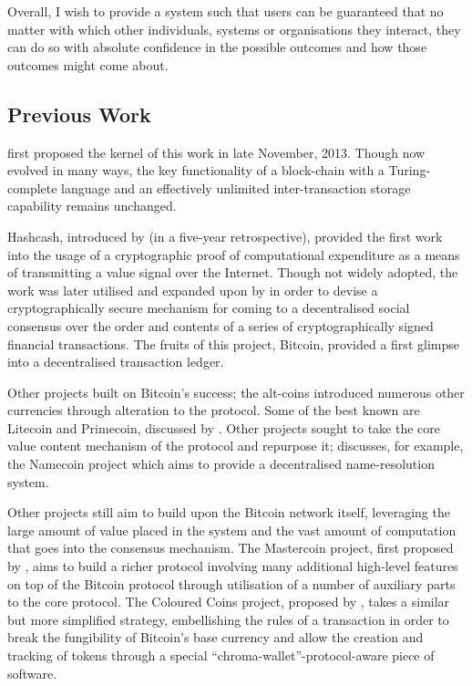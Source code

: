 \documentclass[9pt,oneside]{amsart}
\begin{document}
\begin{multicols}{2}
Overall, I wish to provide a system such that users can be guaranteed that no matter with which other individuals, systems or organisations they interact, they can do so with absolute confidence in the possible outcomes and how those outcomes might come about.

\subsection{Previous Work} \label{ch:previous}

\cite{buterin2013ethereum} first proposed the kernel of this work in late November, 2013. Though now evolved in many ways, the key functionality of a block-chain with a Turing-complete language and an effectively unlimited inter-transaction storage capability remains unchanged.

Hashcash, introduced by \cite{back2002hashcash} (in a five-year retrospective), provided the first work into the usage of a cryptographic proof of computational expenditure as a means of transmitting a value signal over the Internet. Though not widely adopted, the work was later utilised and expanded upon by \cite{nakamoto2008bitcoin} in order to devise a cryptographically secure mechanism for coming to a decentralised social consensus over the order and contents of a series of cryptographically signed financial transactions. The fruits of this project, Bitcoin, provided a first glimpse into a decentralised transaction ledger.

Other projects built on Bitcoin's success; the alt-coins introduced numerous other currencies through alteration to the protocol. Some of the best known are Litecoin and Primecoin, discussed by \cite{sprankel2013technical}. Other projects sought to take the core value content mechanism of the protocol and repurpose it; \cite{aron2012bitcoin} discusses, for example, the Namecoin project which aims to provide a decentralised name-resolution system.

Other projects still aim to build upon the Bitcoin network itself, leveraging the large amount of value placed in the system and the vast amount of computation that goes into the consensus mechanism. The Mastercoin project, first proposed by \cite{mastercoin2013willett}, aims to build a richer protocol involving many additional high-level features on top of the Bitcoin protocol through utilisation of a number of auxiliary parts to the core protocol. The Coloured Coins project, proposed by \cite{colouredcoins2012rosenfeld}, takes a similar but more simplified strategy, embellishing the rules of a transaction in order to break the fungibility of Bitcoin's base currency and allow the creation and tracking of tokens through a special ``chroma-wallet''-protocol-aware piece of software.


\end{multicols}
\end{document}
